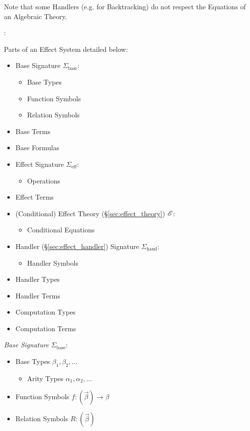 \fist Note that some Handlers (e.g. for Backtracking) do not
respect the Equations of an Algebraic Theory. \cite{pretnar15}

\cite{plotkin-pretnar09}:

Parts of an Effect System detailed below:
\begin{itemize}
  \item Base Signature $\Sigma_\mathrm{base}$:
    \begin{itemize}
      \item Base Types
      \item Function Symbols
      \item Relation Symbols
    \end{itemize}
  \item Base Terms
  \item Base Formulas
  \item Effect Signature $\Sigma_\mathrm{eff}$:
    \begin{itemize}
      \item Operations
    \end{itemize}
  \item Effect Terms
  \item (Conditional) Effect Theory (\S\ref{sec:effect_theory})
    $\mathscr{E}$:
    \begin{itemize}
      \item Conditional Equations
    \end{itemize}
  \item Handler (\S\ref{sec:effect_handler}) Signature
    $\Sigma_\mathrm{hand}$:
    \begin{itemize}
      \item Handler Symbols
    \end{itemize}
  \item Handler Types
  \item Handler Terms
  \item Computation Types
  \item Computation Terms
\end{itemize}


\emph{Base Signature} $\Sigma_{\mathrm{base}}$:
\begin{itemize}
  \item Base Types $\beta_1, \beta_2, \ldots$
  \begin{itemize}
    \item Arity Types $\alpha_1, \alpha_2, \ldots$
  \end{itemize}
  \item Function Symbols $f : (\vec{\beta}) \rightarrow \beta$
  \item Relation Symbols $R : (\vec{\beta})$
\end{itemize}

